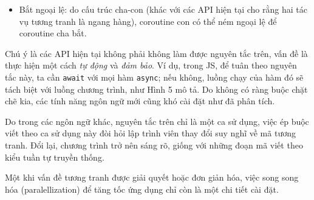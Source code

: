 \documentclass[../../thesis]{subfiles}
\begin{document}
\begin{itemize}[resume, before = \vspace*{-\dimexpr\topsep+\partopsep\relax}]
    \item
        Bắt ngoại lệ: do cấu trúc cha-con (khác với các API hiện tại cho rằng
        hai tác vụ tương tranh là ngang hàng), coroutine con có thể ném ngoại lệ
        để coroutine cha bắt.
\end{itemize}

Chú ý là các API hiện tại không phải không làm được nguyên tắc trên, vấn đề là
thực hiện một cách \emph{tự động} và \emph{đảm bảo}. Ví dụ, trong JS, để tuân
theo nguyên tắc này, ta cần \texttt{await} với mọi hàm \texttt{async}; nếu
không, luồng chạy của hàm đó sẽ tách biệt với luồng chương trình, như Hình 5 mô
tả. Do không có ràng buộc chặt chẽ kia, các tính năng ngôn ngữ mới cũng khó cài
đặt như đã phân tích.

Do trong các ngôn ngữ khác, nguyên tắc trên chỉ là một ca sử dụng, việc ép buộc
viết theo ca sử dụng này đòi hỏi lập trình viên thay đổi suy nghĩ về mã tương
tranh. Đổi lại, chương trình trở nên sáng rõ, giống với những đoạn mã viết theo
kiểu tuần tự truyền thống.

Một khi vấn đề tương tranh được giải quyết hoặc đơn giản hóa, việc song song hóa
(paralellization) để tăng tốc ứng dụng chỉ còn là một chi tiết cài đặt.
\end{document}
